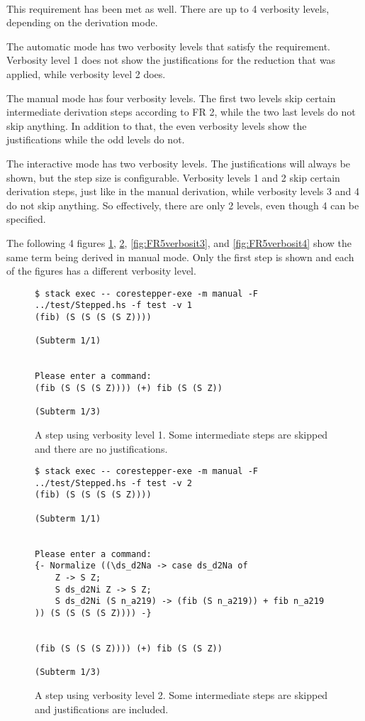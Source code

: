 \ \\
This requirement has been met as well.
There are up to 4 verbosity levels, depending on the derivation mode.

The automatic mode has two verbosity levels that satisfy the requirement.
Verbosity level 1 does not show the justifications for the reduction that was applied,
while verbosity level 2 does.

The manual mode has four verbosity levels.
The first two levels skip certain intermediate derivation steps according to FR 2,
while the two last levels do not skip anything.
In addition to that,
the even verbosity levels show the justifications while the odd levels do not.

The interactive mode has two verbosity levels.
The justifications will always be shown,
but the step size is configurable.
Verbosity levels 1 and 2 skip certain derivation steps, just like in the manual derivation,
while verbosity levels 3 and 4 do not skip anything.
So effectively, there are only 2 levels, even though 4 can be specified.

The following 4 figures \ref*{fig:FR5verbosit1}, \ref*{fig:FR5verbosit2}, \ref*{fig:FR5verbosit3}, and \ref*{fig:FR5verbosit4} show the same term being derived in manual mode.
Only the first step is shown and each of the figures has a different verbosity level.

\begin{figure}[!ht]
\begin{verbatim}
$ stack exec -- corestepper-exe -m manual -F ../test/Stepped.hs -f test -v 1
(fib) (S (S (S (S Z))))

(Subterm 1/1)


Please enter a command:
(fib (S (S (S Z)))) (+) fib (S (S Z))

(Subterm 1/3)
\end{verbatim}
    \caption{A step using verbosity level 1. Some intermediate steps are skipped and there are no justifications.}
    \label{fig:FR5verbosit1}
\end{figure}

\begin{figure}[!ht]
\begin{verbatim}
$ stack exec -- corestepper-exe -m manual -F ../test/Stepped.hs -f test -v 2
(fib) (S (S (S (S Z))))

(Subterm 1/1)


Please enter a command:
{- Normalize ((\ds_d2Na -> case ds_d2Na of
    Z -> S Z;
    S ds_d2Ni Z -> S Z;
    S ds_d2Ni (S n_a219) -> (fib (S n_a219)) + fib n_a219
)) (S (S (S (S Z)))) -}


(fib (S (S (S Z)))) (+) fib (S (S Z))

(Subterm 1/3)
\end{verbatim}
    \caption{A step using verbosity level 2. Some intermediate steps are skipped and justifications are included.}
    \label{fig:FR5verbosit2}
\end{figure}

